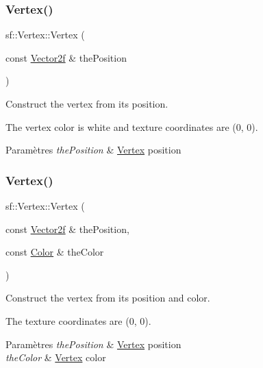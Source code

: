 \subsubsection{\texorpdfstring{Vertex()}{Vertex()}\hspace{0.1cm}{\footnotesize\ttfamily [1/4]}}
{\footnotesize\ttfamily sf\+::\+Vertex\+::\+Vertex (\begin{DoxyParamCaption}\item[{const \hyperlink{classsf_1_1Vector2}{Vector2f} \&}]{the\+Position }\end{DoxyParamCaption})}



Construct the vertex from its position. 

The vertex color is white and texture coordinates are (0, 0).


\begin{DoxyParams}{Paramètres}
{\em the\+Position} & \hyperlink{classsf_1_1Vertex}{Vertex} position \\
\hline
\end{DoxyParams}
\mbox{\label{classsf_1_1Vertex_a70b0679b4ec531d5bd1a7d0225c7321a}} 
\subsubsection{\texorpdfstring{Vertex()}{Vertex()}\hspace{0.1cm}{\footnotesize\ttfamily [2/4]}}
{\footnotesize\ttfamily sf\+::\+Vertex\+::\+Vertex (\begin{DoxyParamCaption}\item[{const \hyperlink{classsf_1_1Vector2}{Vector2f} \&}]{the\+Position,  }\item[{const \hyperlink{classsf_1_1Color}{Color} \&}]{the\+Color }\end{DoxyParamCaption})}



Construct the vertex from its position and color. 

The texture coordinates are (0, 0).


\begin{DoxyParams}{Paramètres}
{\em the\+Position} & \hyperlink{classsf_1_1Vertex}{Vertex} position \\
\hline
{\em the\+Color} & \hyperlink{classsf_1_1Vertex}{Vertex} color \\
\hline
\end{DoxyParams}
\mbox{\label{classsf_1_1Vertex_ab9bf849c4c0d82d09bf5bece23d2456a}} 

